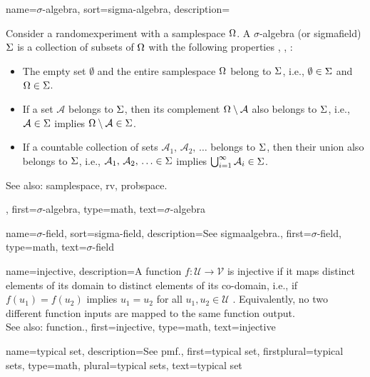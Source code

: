 {name={$\sigma$-algebra}, 
sort={sigma-algebra},
	description={Consider a \gls{randomexperiment} with a \gls{samplespace} $\Omega$. 
		A $\sigma$-algebra (or \gls{sigmafield}) $\Sigma$ 
		is a collection of subsets of $\Omega$ with the following properties 
		\cite{RudinBook}, \cite{BillingsleyProbMeasure}, \cite{durrett2010probability}:
		\begin{itemize}
		 	\item The empty set $\emptyset$ and the entire \gls{samplespace} 
		 	$\Omega$ belong to $\Sigma$, i.e., $\emptyset \in \Sigma$ and $\Omega \in \Sigma$.
		 	\item If a set $\mathcal{A}$ belongs to $\Sigma$, then its complement 
		 	$\Omega \setminus \mathcal{A}$ also belongs to $\Sigma$, i.e., 
		 	$\mathcal{A} \in \Sigma$ implies $\Omega \setminus \mathcal{A} \in \Sigma$.
		 	\item If a \gls{countable} collection of sets $\mathcal{A}_1, \,\mathcal{A}_2, \,\ldots$ belongs 
			to $\Sigma$, 
		 	then their union also belongs to $\Sigma$, i.e.,
		 	$\mathcal{A}_1, \,\mathcal{A}_2, \,\ldots \in \Sigma$ implies 
		 	$\bigcup_{i=1}^{\infty} \mathcal{A}_i \in \Sigma$.	
		 \end{itemize}			 
		See also: \gls{samplespace}, \gls{rv}, \gls{probspace}.},
	first={$\sigma$-algebra},
	type=math, 
	text={$\sigma$-algebra} 
}

{name={$\sigma$-field}, 
sort={sigma-field},
	description={See \gls{sigmaalgebra}.}, 
	first={$\sigma$-field},
	type=math,
	text={$\sigma$-field} 
}

{name={injective}, 
	description={A \gls{function} $f: \mathcal{U} \rightarrow \mathcal{V}$ is injective 
		if it maps distinct elements of its \gls{domain} to distinct elements 
		of its \gls{co-domain}, 
    		i.e., if $f(u_1) = f(u_2)$ implies $u_1 = u_2$ for all $u_1, u_2 \in \mathcal{U}$ 
        		\cite{HalmosSet}. 
    		Equivalently, no two different \gls{function} inputs are mapped to the same \gls{function} \gls{output}.
				\\
		See also: \gls{function}.},
	first={injective},
	type=math,
	text={injective} 
}

{name={typical set}, 
	description={See \gls{pmf}.}, 
 	first={typical set},
 	firstplural={typical sets},
 	type=math,
 	plural={typical sets},
 	text={typical set} 
}

